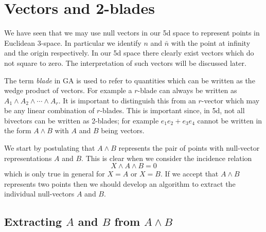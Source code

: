 \section{Vectors and 2-blades}

We have seen that we may use null vectors in our 5d space to represent 
points in Euclidean 3-space. In particular we identify $n$ and $\bar{n}$ with 
the point at infinity and the origin respectively. In our 5d space there
clearly exist vectors which do not square to zero. The interpretation of such 
vectors will be discussed later.

The term \emph{blade} in GA is used to refer to quantities which can be written as the wedge
product of vectors. For example a $r$-blade can always be written as
$A_1\wedge A_2 \wedge \cdots \wedge A_r$. It is important to distinguish this
from an $r$-vector which may be any linear combination of $r$-blades. 
This is important since, in 5d, not all bivectors can be written as 2-blades;
for example $e_1e_2 + e_3e_4$ cannot be written in the form $A\wedge B$
with $A$ and $B$ being vectors. 

We start by
postulating that $A \wedge B$ represents the pair of points 
with null-vector representations $A$ and $B$. This is clear when 
we consider the incidence 
relation
\[
X \wedge A \wedge B = 0
\]
which is only true in general for $X=A$ or $X=B$. If we accept that
$A\wedge B$ represents two points then we should develop 
an algorithm to extract the individual null-vectors $A$ and $B$.

\subsection{Extracting $A$ and $B$ from $A\wedge B$}
\label{sec:projectors}

